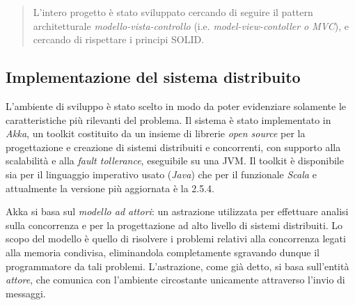 \begin{quote}
L'intero progetto è stato sviluppato cercando di seguire
il pattern architetturale \emph{modello-vista-controllo} (i.e. \emph{model-view-contoller o MVC}), e cercando di rispettare i principi SOLID.
\end{quote}
\begin{figure}
\end{figure}

\subsection{Implementazione del sistema distribuito}
\label{sec:akka}
L'ambiente di sviluppo è stato scelto in modo da poter
evidenziare solamente le caratteristiche più rilevanti del problema.
Il sistema è stato implementato in \emph{Akka}, un toolkit costituito da un 
insieme di librerie \emph{open source} per la progettazione e creazione
di sistemi distribuiti e concorrenti, con supporto alla scalabilità e alla
\emph{fault tollerance}, eseguibile su una JVM.
Il toolkit è disponibile sia per il linguaggio imperativo usato (\emph{Java})
che per il funzionale \emph{Scala} e attualmente la versione più aggiornata 
è la 2.5.4.

Akka si basa sul \emph{modello ad attori}: un astrazione utilizzata per
effettuare analisi sulla concorrenza e per la progettazione ad alto livello
di sistemi distribuiti.
Lo scopo del modello è  quello di risolvere i problemi relativi alla concorrenza
legati alla memoria condivisa, eliminandola completamente sgravando dunque
il programmatore da tali problemi. L'astrazione, come già detto, si basa sull'entità
\emph{attore}, che comunica con l'ambiente circostante unicamente attraverso l'invio di messaggi.

